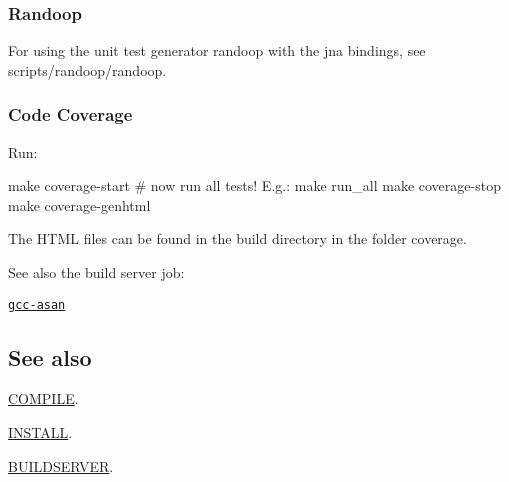 \subsubsection*{Randoop}

For using the unit test generator randoop with the jna bindings, see {\ttfamily scripts/randoop/randoop}.

\subsubsection*{Code Coverage}

Run\+: \begin{DoxyVerb}    make coverage-start
    # now run all tests! E.g.:
    make run_all
    make coverage-stop
    make coverage-genhtml
\end{DoxyVerb}


The H\+T\+ML files can be found in the build directory in the folder {\ttfamily coverage}.

See also the build server job\+:


\begin{DoxyItemize}
\item \href{https://build.libelektra.org/job/elektra-incremental/}{\tt gcc-\/asan}
\end{DoxyItemize}

\subsection*{See also}


\begin{DoxyItemize}
\item \hyperlink{doc_COMPILE_md}{C\+O\+M\+P\+I\+LE}.
\item \hyperlink{doc_INSTALL_md}{I\+N\+S\+T\+A\+LL}.
\item \hyperlink{doc_BUILDSERVER_md}{B\+U\+I\+L\+D\+S\+E\+R\+V\+ER}. 
\end{DoxyItemize}